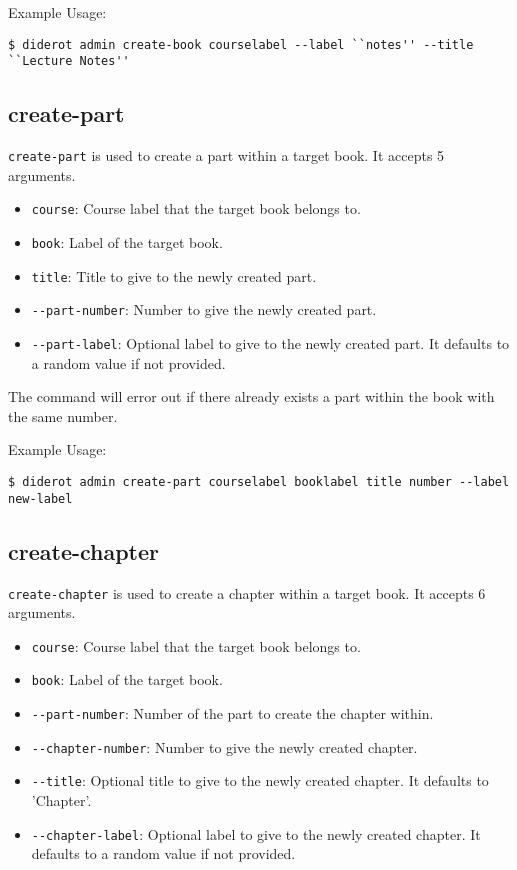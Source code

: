 Example Usage:
\begin{verbatim}
$ diderot admin create-book courselabel --label ``notes'' --title ``Lecture Notes''
\end{verbatim}


\subsection{create-part}

\verb|create-part| is used to create a part within a target book. It accepts 5 arguments.
%
\begin{itemize}
  \item \verb|course|: Course label that the target book belongs to.
  \item \verb|book|: Label of the target book.
  \item \verb|title|: Title to give to the newly created part.
  \item \verb|--part-number|: Number to give the newly created part.
  \item \verb|--part-label|: Optional label to give to the newly created part. It defaults to a random value if not provided.
\end{itemize}
%
The command will error out if there already exists a part within the book with the same number.

\begin{example}
Example Usage:
\begin{verbatim}
$ diderot admin create-part courselabel booklabel title number --label new-label
\end{verbatim}
\end{example}

\subsection{create-chapter}

\verb|create-chapter| is used to create a chapter within a target book. It accepts 6 arguments.

\begin{itemize}
  \item \verb|course|: Course label that the target book belongs to.
  \item \verb|book|: Label of the target book.
  \item \verb|--part-number|: Number of the part to create the chapter within.
  \item \verb|--chapter-number|: Number to give the newly created chapter.
  \item \verb|--title|: Optional title to give to the newly created chapter. It defaults to 'Chapter'.
  \item \verb|--chapter-label|: Optional label to give to the newly created chapter. It defaults to a random value if not provided.
\end{itemize}

